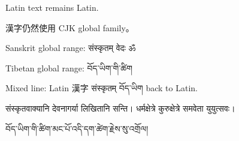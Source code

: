 \documentclass[12pt]{article}
\begin{document}
Latin text remains Latin.

漢字仍然使用 CJK global family。

Sanskrit global range: संस्कृतम् वेदः ॐ

Tibetan global range: བོད་ཡིག་གི་ཚིག

Mixed line: Latin 漢字 संस्कृतम् བོད་ཡིག back to Latin.

\noindent\parbox{2.8cm}{संस्कृतवाक्यानि देवनागर्या लिखितानि सन्ति। धर्मक्षेत्रे कुरुक्षेत्रे समवेता युयुत्सवः।}

\noindent\parbox{2.8cm}{བོད་ཡིག་གི་ཚིག་མང་པོ་འདི་དག་ཚེག་རྗེས་སུ་འགྲོལ།}
\end{document}
